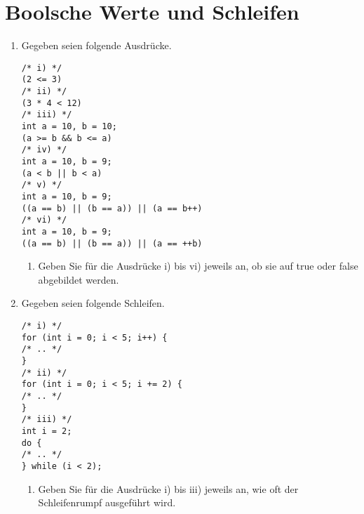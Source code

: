 \documentclass[ngerman]{tudscrreprt}
\begin{document}
%
\section*{Boolsche Werte und Schleifen}
\begin{enumerate}
\item Gegeben seien folgende Ausdrücke.
\begin{lstlisting}[frame=single]
/* i) */
(2 <= 3)
/* ii) */
(3 * 4 < 12)
/* iii) */
int a = 10, b = 10;
(a >= b && b <= a)
/* iv) */
int a = 10, b = 9;
(a < b || b < a)
/* v) */
int a = 10, b = 9;
((a == b) || (b == a)) || (a == b++)
/* vi) */
int a = 10, b = 9;
((a == b) || (b == a)) || (a == ++b)
\end{lstlisting}
\begin{enumerate}
\item Geben Sie für die Ausdrücke i) bis vi) jeweils an, ob sie auf true oder false abgebildet werden.
\end{enumerate}
\pagebreak
\item Gegeben seien folgende Schleifen.
\begin{lstlisting}[frame=single]
/* i) */
for (int i = 0; i < 5; i++) {
/* .. */
}
/* ii) */
for (int i = 0; i < 5; i += 2) {
/* .. */
}
/* iii) */
int i = 2;
do {
/* .. */
} while (i < 2);
\end{lstlisting}
\begin{enumerate}
\item Geben Sie für die Ausdrücke i) bis iii) jeweils an, wie oft der Schleifenrumpf ausgeführt wird.
\end{enumerate}
\end{enumerate}
\pagebreak
\end{document}
